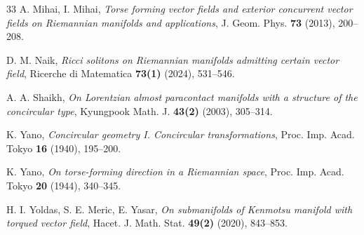\documentclass[12pt]{amsart}
\theoremstyle{definition}
\begin{document}
\begin{thebibliography}{33}
 A. Mihai,  I. Mihai, {\it Torse forming vector fields and exterior concurrent vector fields on Riemannian manifolds and applications}, J. Geom. Phys. {\bf 73} (2013), 200--208.

 D. M. Naik, {\it Ricci solitons on Riemannian manifolds admitting certain
vector field}, Ricerche di Matematica {\bf 73(1)} (2024), 531--546.

A. A. Shaikh, {\it On Lorentzian almost paracontact manifolds with a structure of the concircular type}, Kyungpook Math. J. {\bf 43(2)} (2003), 305--314.

 K. Yano, {\it Concircular geometry I. Concircular transformations}, Proc. Imp. Acad. Tokyo {\bf 16} (1940), 195--200.

 K. Yano, {\it On torse-forming direction in a Riemannian space}, Proc. Imp. Acad. Tokyo {\bf 20} (1944),
340--345.

 H. I. Yoldas, S. E. Meric, E. Yasar, {\it On submanifolds of Kenmotsu manifold with torqued vector field}, Hacet. J. Math. Stat. {\bf 49(2)} (2020), 843--853.



\end{thebibliography}
\end{document}
